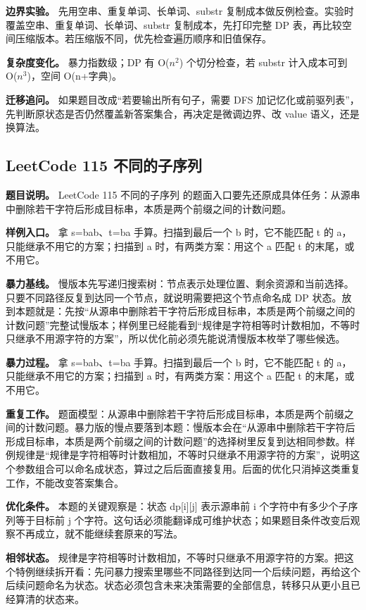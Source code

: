 \textbf{边界实验。} 先用空串、重复单词、长单词、substr 复制成本做反例检查。实验时覆盖空串、重复单词、长单词、substr 复制成本，先打印完整 DP 表，再比较空间压缩版本。若压缩版不同，优先检查遍历顺序和旧值保存。

\textbf{复杂度变化。} 暴力指数级；DP 有 O(\ensuremath{n^{2}}) 个切分检查，若 substr 计入成本可到 O(\ensuremath{n^{3}})，空间 O(n+字典)。

\textbf{迁移追问。} 如果题目改成“若要输出所有句子，需要 DFS 加记忆化或前驱列表”，先判断原状态是否仍然覆盖新答案集合，再决定是微调边界、改 value 语义，还是换算法。

\subsection{LeetCode 115 不同的子序列}

\textbf{题目说明。} LeetCode 115 不同的子序列 的题面入口要先还原成具体任务：从源串中删除若干字符后形成目标串，本质是两个前缀之间的计数问题。

\textbf{样例入口。} 拿 s=bab、t=ba 手算。扫描到最后一个 b 时，它不能匹配 t 的 a，只能继承不用它的方案；扫描到 a 时，有两类方案：用这个 a 匹配 t 的末尾，或不用它。

\textbf{暴力基线。} 慢版本先写递归搜索树：节点表示处理位置、剩余资源和当前选择。只要不同路径反复到达同一个节点，就说明需要把这个节点命名成 DP 状态。放到本题就是：先按“从源串中删除若干字符后形成目标串，本质是两个前缀之间的计数问题”完整试慢版本；样例里已经能看到“规律是字符相等时计数相加，不等时只继承不用源字符的方案”，所以优化前必须先能说清慢版本枚举了哪些候选。

\textbf{暴力过程。} 拿 s=bab、t=ba 手算。扫描到最后一个 b 时，它不能匹配 t 的 a，只能继承不用它的方案；扫描到 a 时，有两类方案：用这个 a 匹配 t 的末尾，或不用它。

\textbf{重复工作。} 题面模型：从源串中删除若干字符后形成目标串，本质是两个前缀之间的计数问题。暴力版的慢点要落到本题：慢版本会在“从源串中删除若干字符后形成目标串，本质是两个前缀之间的计数问题”的选择树里反复到达相同参数。样例规律是“规律是字符相等时计数相加，不等时只继承不用源字符的方案”，说明这个参数组合可以命名成状态，算过之后后面直接复用。后面的优化只消掉这类重复工作，不能改变答案集合。

\textbf{优化条件。} 本题的关键观察是：状态 dp[i][j] 表示源串前 i 个字符中有多少个子序列等于目标前 j 个字符。这句话必须能翻译成可维护状态；如果题目条件改变后观察不再成立，就不能继续套原来的写法。

\textbf{相邻状态。} 规律是字符相等时计数相加，不等时只继承不用源字符的方案。把这个特例继续拆开看：先问暴力搜索里哪些不同路径到达同一个后续问题，再给这个后续问题命名为状态。状态必须包含未来决策需要的全部信息，转移只从更小且已经算清的状态来。

